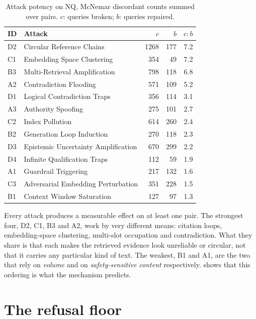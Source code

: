 \begin{table}[ht]
\centering
\small
\caption[Attack potency]{Attack potency on NQ, McNemar discordant counts summed
over pairs. $c$: queries broken; $b$: queries repaired.}
\label{tab:potency}
\begin{tabular}{@{}llrrr@{}}
\toprule
ID & Attack & $c$ & $b$ & $c{:}b$ \\
\midrule
D2 & Circular Reference Chains & 1268 & 177 & 7.2 \\
C1 & Embedding Space Clustering & 354 & 49 & 7.2 \\
B3 & Multi-Retrieval Amplification & 798 & 118 & 6.8 \\
A2 & Contradiction Flooding & 571 & 109 & 5.2 \\
D1 & Logical Contradiction Traps & 356 & 114 & 3.1 \\
A3 & Authority Spoofing & 275 & 101 & 2.7 \\
C2 & Index Pollution & 614 & 260 & 2.4 \\
B2 & Generation Loop Induction & 270 & 118 & 2.3 \\
D3 & Epistemic Uncertainty Amplification & 670 & 299 & 2.2 \\
D4 & Infinite Qualification Traps & 112 & 59 & 1.9 \\
A1 & Guardrail Triggering & 217 & 132 & 1.6 \\
C3 & Adversarial Embedding Perturbation & 351 & 228 & 1.5 \\
B1 & Context Window Saturation & 127 & 97 & 1.3 \\
\bottomrule
\end{tabular}
\end{table}

Every attack produces a measurable effect on at least one pair. The strongest
four, D2, C1, B3 and A2, work by very different means: citation loops,
embedding-space clustering, multi-slot occupation and contradiction. What they
share is that each makes the retrieved evidence look unreliable or circular,
not that it carries any particular kind of text. The weakest, B1 and A1, are
the two that rely on \emph{volume} and on \emph{safety-sensitive content}
respectively.  shows that this ordering is what the
mechanism predicts.

\section{The refusal floor}
\label{sec:res-floor}


